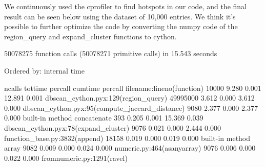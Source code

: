 \documentclass{article}
\begin{document}
We continuously used the cprofiler to find hotspots in our code, and the final result can be seen below using the dataset of 10,000 entries.
We think it's possible to further optimize the code by converting the numpy code of the region\_query and expand\_cluster functions to cython.
\begin{pythonOutput}
        50078275 function calls (50078271 primitive calls) in 15.543 seconds

   Ordered by: internal time

   ncalls  tottime  percall  cumtime  percall filename:lineno(function)
    10000    9.280    0.001   12.891    0.001 dbscan_cython.pyx:129(region_query)
 49995000    3.612    0.000    3.612    0.000 dbscan_cython.pyx:95(compute_jaccard_distance)
     9080    2.377    0.000    2.377    0.000 {built-in method concatenate}
      393    0.205    0.001   15.369    0.039 dbscan_cython.pyx:78(expand_cluster)
     9076    0.021    0.000    2.444    0.000 function_base.py:3832(append)
    18158    0.019    0.000    0.019    0.000 {built-in method array}
     9082    0.009    0.000    0.024    0.000 numeric.py:464(asanyarray)
     9076    0.006    0.000    0.022    0.000 fromnumeric.py:1291(ravel)

\end{pythonOutput}
\end{document}
